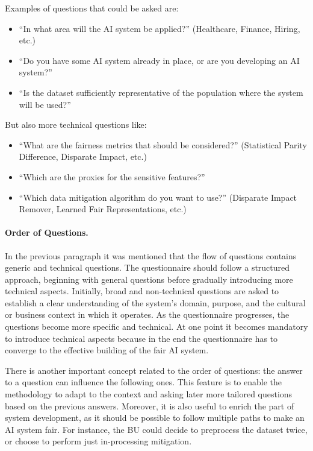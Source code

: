 \documentclass[12pt,a4paper,openright,twoside]{book}
\begin{document}
Examples of questions that could be asked are:
\begin{itemize}
    \item ``In what area will the \ac{AI} system be applied?'' (Healthcare, Finance, Hiring, etc.)
    \item ``Do you have some AI system already in place, or are you developing an AI system?''
    \item ``Is the dataset sufficiently representative of the population where the system will be used?''
\end{itemize}
%
But also more technical questions like:
\begin{itemize}
    \item ``What are the fairness metrics that should be considered?'' (Statistical Parity Difference, Disparate Impact, etc.)
    \item ``Which are the proxies for the sensitive features?''
    \item ``Which data mitigation algorithm do you want to use?'' (Disparate Impact Remover, Learned Fair Representations, etc.)
\end{itemize}


\paragraph{Order of Questions.}
In the previous paragraph it was mentioned that the flow of questions contains generic and technical questions.
%
The questionnaire should follow a structured approach, beginning with general questions before gradually introducing more technical aspects.
%
Initially, broad and non-technical questions are asked to establish a clear understanding of the system’s domain, purpose, and the cultural or business context in which it operates.
%
As the questionnaire progresses, the questions become more specific and technical.
%
At one point it becomes mandatory to introduce technical aspects because in the end the questionnaire has to converge to the effective building of the fair \ac{AI} system.

There is another important concept related to the order of questions: the answer to a question can influence the following ones.
%
This feature is to enable the methodology to adapt to the context and asking later more tailored questions based on the previous answers.
%
Moreover, it is also useful to enrich the part of system development, as it should be possible to follow multiple paths to make an AI system fair.
%
For instance, the \acl{BU} could decide to preprocess the dataset twice, or choose to perform just in-processing mitigation.
\end{document}

